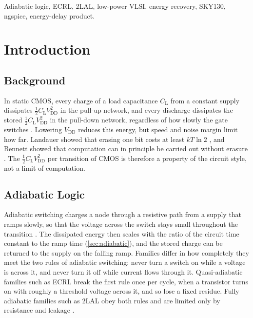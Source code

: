 \documentclass[conference]{IEEEtran}
\newcommand{\VDD}{V_{\mathrm{DD}}}
\newcommand{\CL}{C_{\mathrm{L}}}
\begin{document}
\begin{IEEEkeywords}
Adiabatic logic, ECRL, 2LAL, low-power VLSI, energy recovery, SKY130,
ngspice, energy-delay product.
\end{IEEEkeywords}

\section{Introduction}
\label{sec:intro}

\subsection{Background}
In static CMOS, every charge of a load capacitance $\CL$ from a constant supply
dissipates $\tfrac12\CL\VDD^2$ in the pull-up network, and every discharge
dissipates the stored $\tfrac12\CL\VDD^2$ in the pull-down network, regardless
of how slowly the gate switches \cite{chandrakasan1992,rabaey2003}. Lowering
$\VDD$ reduces this energy, but speed and noise margin limit how far.
Landauer showed that erasing one bit costs at least $kT\ln2$
\cite{landauer1961}, and Bennett showed that computation can in principle
be carried out without erasure \cite{bennett1973}. The $\tfrac12\CL\VDD^2$
per transition of CMOS is therefore a property of the circuit style, not a
limit of computation.

\subsection{Adiabatic Logic}
Adiabatic switching charges a node through a resistive path from a supply that
ramps slowly, so that the voltage across the switch stays small throughout
the transition \cite{koller1992,athas1994}. The dissipated energy then scales
with the ratio of the circuit time constant to the ramp time
(\cref{sec:adiabatic}), and the stored charge can be returned to the supply on
the falling ramp. Families differ in how completely they meet the two rules
of adiabatic switching: never turn a switch on while a voltage is across it,
and never turn it off while current flows through it. Quasi-adiabatic
families such as ECRL break the first rule once per cycle, when a transistor
turns on with roughly a threshold voltage across it, and so lose a fixed
residue. Fully adiabatic families such as 2LAL obey both rules and are
limited only by resistance and leakage \cite{frank2020icrc}.
\end{document}
